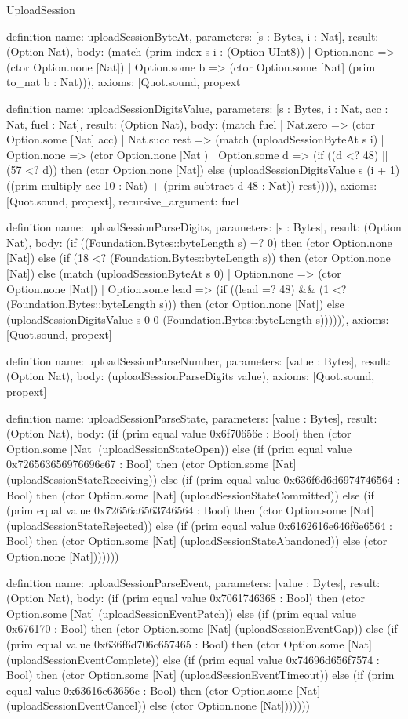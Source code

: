 \begin{lexlean}{UploadSession}
\begin{semanticmodule}
definition{
  name: uploadSessionByteAt,
  parameters: [s : Bytes, i : Nat],
  result: (Option Nat),
  body: (match (prim index s i : (Option UInt8))
    | Option.none => (ctor Option.none [Nat])
    | Option.some b => (ctor Option.some [Nat] (prim to_nat b : Nat))),
  axioms: [Quot.sound, propext]
}

definition{
  name: uploadSessionDigitsValue,
  parameters: [s : Bytes, i : Nat, acc : Nat, fuel : Nat],
  result: (Option Nat),
  body: (match fuel
    | Nat.zero => (ctor Option.some [Nat] acc)
    | Nat.succ rest => (match (uploadSessionByteAt s i)
      | Option.none => (ctor Option.none [Nat])
      | Option.some d => (if ((d <? 48) || (57 <? d)) then (ctor Option.none [Nat]) else (uploadSessionDigitsValue s (i + 1) ((prim multiply acc 10 : Nat) + (prim subtract d 48 : Nat)) rest)))),
  axioms: [Quot.sound, propext],
  recursive_argument: fuel
}

definition{
  name: uploadSessionParseDigits,
  parameters: [s : Bytes],
  result: (Option Nat),
  body: (if ((Foundation.Bytes::byteLength s) =? 0) then (ctor Option.none [Nat]) else (if (18 <? (Foundation.Bytes::byteLength s)) then (ctor Option.none [Nat]) else (match (uploadSessionByteAt s 0)
    | Option.none => (ctor Option.none [Nat])
    | Option.some lead => (if ((lead =? 48) && (1 <? (Foundation.Bytes::byteLength s))) then (ctor Option.none [Nat]) else (uploadSessionDigitsValue s 0 0 (Foundation.Bytes::byteLength s)))))),
  axioms: [Quot.sound, propext]
}

definition{
  name: uploadSessionParseNumber,
  parameters: [value : Bytes],
  result: (Option Nat),
  body: (uploadSessionParseDigits value),
  axioms: [Quot.sound, propext]
}

definition{
  name: uploadSessionParseState,
  parameters: [value : Bytes],
  result: (Option Nat),
  body: (if (prim equal value 0x6f70656e : Bool) then (ctor Option.some [Nat] (uploadSessionStateOpen)) else (if (prim equal value 0x726563656976696e67 : Bool) then (ctor Option.some [Nat] (uploadSessionStateReceiving)) else (if (prim equal value 0x636f6d6d6974746564 : Bool) then (ctor Option.some [Nat] (uploadSessionStateCommitted)) else (if (prim equal value 0x72656a6563746564 : Bool) then (ctor Option.some [Nat] (uploadSessionStateRejected)) else (if (prim equal value 0x6162616e646f6e6564 : Bool) then (ctor Option.some [Nat] (uploadSessionStateAbandoned)) else (ctor Option.none [Nat]))))))
}

definition{
  name: uploadSessionParseEvent,
  parameters: [value : Bytes],
  result: (Option Nat),
  body: (if (prim equal value 0x7061746368 : Bool) then (ctor Option.some [Nat] (uploadSessionEventPatch)) else (if (prim equal value 0x676170 : Bool) then (ctor Option.some [Nat] (uploadSessionEventGap)) else (if (prim equal value 0x636f6d706c657465 : Bool) then (ctor Option.some [Nat] (uploadSessionEventComplete)) else (if (prim equal value 0x74696d656f7574 : Bool) then (ctor Option.some [Nat] (uploadSessionEventTimeout)) else (if (prim equal value 0x63616e63656c : Bool) then (ctor Option.some [Nat] (uploadSessionEventCancel)) else (ctor Option.none [Nat]))))))
}


\end{semanticmodule}
\end{lexlean}
